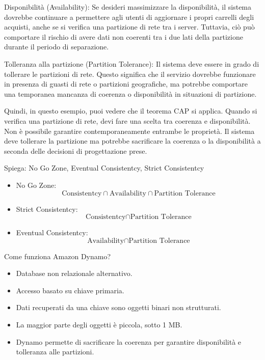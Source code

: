 Disponibilità (Availability): Se desideri massimizzare la disponibilità, il
sistema dovrebbe continuare a permettere agli utenti di aggiornare i propri
carrelli degli acquisti, anche se si verifica una partizione di rete tra i
server. Tuttavia, ciò può comportare il rischio di avere dati non coerenti tra
i due lati della partizione durante il periodo di separazione.

Tolleranza alla partizione (Partition Tolerance): Il sistema deve essere in
grado di tollerare le partizioni di rete. Questo significa che il servizio
dovrebbe funzionare in presenza di guasti di rete o partizioni geografiche, ma
potrebbe comportare una temporanea mancanza di coerenza o disponibilità in
situazioni di partizione.

Quindi, in questo esempio, puoi vedere che il teorema CAP si applica. Quando si
verifica una partizione di rete, devi fare una scelta tra coerenza e
disponibilità. Non è possibile garantire contemporaneamente entrambe le
proprietà. Il sistema deve tollerare la partizione ma potrebbe sacrificare la
coerenza o la disponibilità a seconda delle decisioni di progettazione prese.

\begin{domanda}
    Spiega: No Go Zone, Eventual Consistentcy, Strict Consistentcy
\end{domanda}

\begin{itemize}
    \item No Go Zone: $$\text{Consistentcy} \cap \text{Availability} \cap \text{Partition
                  Tolerance}$$
    \item Strict Consistentcy: $$\text{Consistentcy} \cap \text{Partition Tolerance}$$
    \item Eventual Consistentcy: $$\text{Availability} \cap \text{Partition Tolerance}$$
\end{itemize}

\begin{domanda}
    Come funziona Amazon Dynamo?
\end{domanda}

\begin{itemize}
    \item Database non relazionale alternativo.
    \item Accesso basato su chiave primaria.
    \item Dati recuperati da una chiave sono oggetti binari non strutturati.
    \item La maggior parte degli oggetti è piccola, sotto 1 MB.
    \item Dynamo permette di sacrificare la coerenza per garantire disponibilità e
          tolleranza alle partizioni.
\end{itemize}


